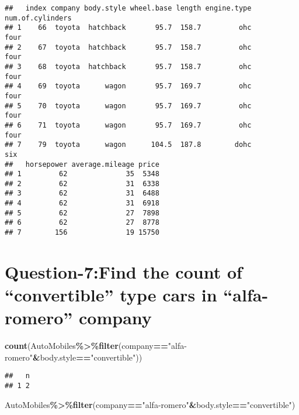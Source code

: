 \documentclass[
]{article}
\newenvironment{Shaded}{\begin{snugshade}}{\end{snugshade}}
\newcommand{\FunctionTok}[1]{\textcolor[rgb]{0.13,0.29,0.53}{\textbf{#1}}}
\newcommand{\NormalTok}[1]{#1}
\newcommand{\SpecialCharTok}[1]{\textcolor[rgb]{0.81,0.36,0.00}{\textbf{#1}}}
\newcommand{\StringTok}[1]{\textcolor[rgb]{0.31,0.60,0.02}{#1}}
\begin{document}
\begin{verbatim}
##   index company body.style wheel.base length engine.type num.of.cylinders
## 1    66  toyota  hatchback       95.7  158.7         ohc             four
## 2    67  toyota  hatchback       95.7  158.7         ohc             four
## 3    68  toyota  hatchback       95.7  158.7         ohc             four
## 4    69  toyota      wagon       95.7  169.7         ohc             four
## 5    70  toyota      wagon       95.7  169.7         ohc             four
## 6    71  toyota      wagon       95.7  169.7         ohc             four
## 7    79  toyota      wagon      104.5  187.8        dohc              six
##   horsepower average.mileage price
## 1         62              35  5348
## 2         62              31  6338
## 3         62              31  6488
## 4         62              31  6918
## 5         62              27  7898
## 6         62              27  8778
## 7        156              19 15750
\end{verbatim}

\hypertarget{question-7find-the-count-of-convertible-type-cars-in-alfa-romero-company}{%
\section{Question-7:Find the count of ``convertible'' type cars in
``alfa-romero''
company}\label{question-7find-the-count-of-convertible-type-cars-in-alfa-romero-company}}

\begin{Shaded}
\begin{Highlighting}[]
\FunctionTok{count}\NormalTok{(AutoMobiles}\SpecialCharTok{\%\textgreater{}\%}\FunctionTok{filter}\NormalTok{(company}\SpecialCharTok{==}\StringTok{"alfa{-}romero"}\SpecialCharTok{\&}\NormalTok{body.style}\SpecialCharTok{==}\StringTok{"convertible"}\NormalTok{))}
\end{Highlighting}
\end{Shaded}

\begin{verbatim}
##   n
## 1 2
\end{verbatim}

\begin{Shaded}
\begin{Highlighting}[]
\NormalTok{AutoMobiles}\SpecialCharTok{\%\textgreater{}\%}\FunctionTok{filter}\NormalTok{(company}\SpecialCharTok{==}\StringTok{"alfa{-}romero"}\SpecialCharTok{\&}\NormalTok{body.style}\SpecialCharTok{==}\StringTok{"convertible"}\NormalTok{)}
\end{Highlighting}
\end{Shaded}
\end{document}
